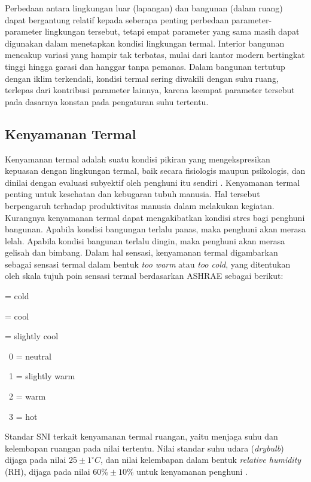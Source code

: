 Perbedaan antara lingkungan luar (lapangan) dan bangunan (dalam ruang) dapat bergantung relatif kepada seberapa penting perbedaan parameter-parameter lingkungan tersebut, tetapi empat parameter yang sama masih dapat digunakan dalam menetapkan kondisi lingkungan termal. Interior bangunan mencakup variasi yang hampir tak terbatas, mulai dari kantor modern bertingkat tinggi hingga garasi dan hanggar tanpa pemanas. Dalam bangunan tertutup dengan iklim terkendali, kondisi termal sering diwakili dengan suhu ruang, terlepas dari kontribusi parameter lainnya, karena keempat parameter tersebut pada dasarnya konstan pada pengaturan suhu tertentu.

\subsection{Kenyamanan Termal}
Kenyamanan termal adalah suatu kondisi pikiran yang mengekspresikan kepuasan dengan lingkungan termal, baik secara fisiologis maupun psikologis, dan dinilai dengan evaluasi subyektif oleh penghuni itu sendiri \cite{ASHRAE55}. Kenyamanan termal penting untuk kesehatan dan kebugaran tubuh manusia. Hal tersebut berpengaruh terhadap produktivitas manusia dalam melakukan kegiatan. Kurangnya kenyamanan termal dapat mengakibatkan kondisi stres bagi penghuni bangunan. Apabila kondisi bangungan terlalu panas, maka penghuni akan merasa lelah. Apabila kondisi bangunan terlalu dingin, maka penghuni akan merasa gelisah dan bimbang. Dalam hal sensasi, kenyamanan termal digambarkan sebagai sensasi termal dalam bentuk \textit{too warm} atau \textit{too cold}, yang ditentukan oleh skala tujuh poin sensasi termal berdasarkan ASHRAE sebagai berikut:

\qquad\qquad\qquad\qquad\qquad{} = cold

\qquad\qquad\qquad\qquad\qquad{} = cool

\qquad\qquad\qquad\qquad\qquad{} = slightly cool

\qquad\qquad\qquad\qquad\qquad\qquad\ 0 = neutral

\qquad\qquad\qquad\qquad\qquad\qquad\ 1 = slightly warm

\qquad\qquad\qquad\qquad\qquad\qquad\ 2 = warm

\qquad\qquad\qquad\qquad\qquad\qquad\ 3 = hot



Standar SNI terkait kenyamanan termal ruangan, yaitu menjaga suhu dan kelembapan ruangan pada nilai tertentu. Nilai standar suhu udara (\textit{drybulb}) dijaga pada nilai $25\pm 1^{\circ}C$, dan nilai kelembapan dalam bentuk \textit{relative humidity} (RH), dijaga pada nilai $60\% \pm 10\%$ untuk kenyamanan penghuni \cite{SNI-03-06390-2000}.

